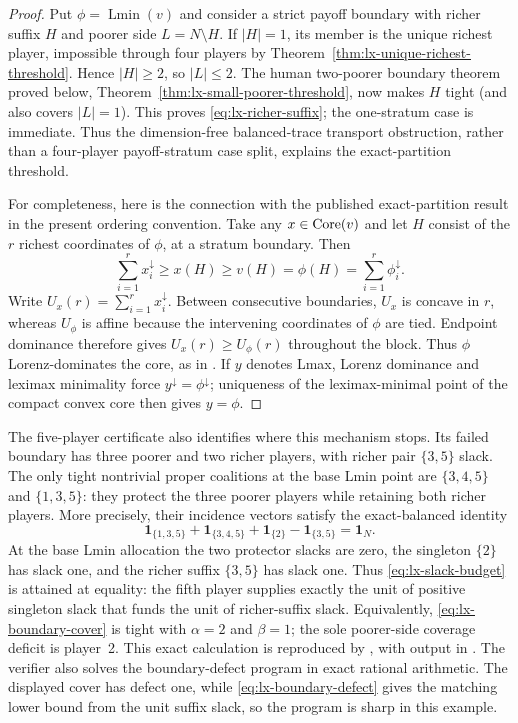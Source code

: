 \begin{proof}
Put $\phi=\operatorname{Lmin}(v)$ and consider a strict payoff boundary with
richer suffix $H$ and poorer side $L=N\setminus H$.  If $|H|=1$, its member
is the unique richest player, impossible through four players by
Theorem~\ref{thm:lx-unique-richest-threshold}.  Hence $|H|\geq2$, so
$|L|\leq2$.  The human two-poorer boundary theorem proved below,
Theorem~\ref{thm:lx-small-poorer-threshold}, now makes $H$ tight (and also
covers $|L|=1$).  This proves \eqref{eq:lx-richer-suffix}; the one-stratum
case is immediate.  Thus the dimension-free balanced-trace transport
obstruction, rather than a four-player payoff-stratum case split, explains
the exact-partition threshold.

For completeness, here is the connection with the published exact-partition
result in the present ordering convention.  Take any $x\in\operatorname{Core}(v)$ and let
$H$ consist of the $r$ richest coordinates of $\phi$, at a stratum boundary.
Then
\[
 \sum_{i=1}^{r}x_i^{\downarrow}\geq x(H)\geq v(H)=\phi(H)
   =\sum_{i=1}^{r}\phi_i^{\downarrow}.
\]
Write $U_x(r)=\sum_{i=1}^r x_i^\downarrow$.  Between consecutive boundaries,
$U_x$ is concave in $r$, whereas $U_\phi$ is affine because the intervening
coordinates of $\phi$ are tied.  Endpoint dominance therefore gives
$U_x(r)\geq U_\phi(r)$ throughout the block.  Thus $\phi$ Lorenz-dominates the
core, as in \citet{LlerenaMauri2017}.  If $y$ denotes Lmax, Lorenz dominance
and leximax minimality force $y^\downarrow=\phi^\downarrow$; uniqueness of the
leximax-minimal point of the compact convex core then gives $y=\phi$.
\end{proof}

The five-player certificate also identifies where this mechanism stops.  Its
failed boundary has three poorer and two richer players, with richer pair
$\{3,5\}$ slack.  The only tight nontrivial proper coalitions at the base Lmin
point are $\{3,4,5\}$ and $\{1,3,5\}$: they protect the three poorer players
while retaining both richer players.  More precisely, their incidence vectors
satisfy the exact-balanced identity
\[
 \mathbf1_{\{1,3,5\}}+\mathbf1_{\{3,4,5\}}
 +\mathbf1_{\{2\}}-\mathbf1_{\{3,5\}}=\mathbf1_N.    \tag{E5}
 \label{eq:lx-five-slack-budget}
\]
At the base Lmin allocation the two protector slacks are zero, the singleton
$\{2\}$ has slack one, and the richer suffix $\{3,5\}$ has slack one.
Thus \eqref{eq:lx-slack-budget} is attained at equality: the fifth player
supplies exactly the unit of positive singleton slack that funds the unit of
richer-suffix slack.  Equivalently, \eqref{eq:lx-boundary-cover} is tight with
$\alpha=2$ and $\beta=1$; the sole poorer-side coverage deficit is player~2.
This exact calculation is reproduced by
, with output in
.  The verifier also solves the
boundary-defect program in exact rational arithmetic.  The displayed cover
has defect one, while \eqref{eq:lx-boundary-defect} gives the matching lower
bound from the unit suffix slack, so the program is sharp in this example.


